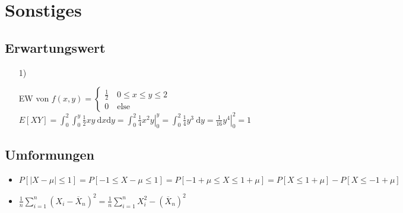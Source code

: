 
\section{Sonstiges}
\subsection{Erwartungswert}
\begin{itemize}
    \item[1)]
        \begin{itemize}
             EW von $f(x,y) =
                \begin{cases}
                    \frac{1}{2} \quad 0 \le x \le y \le 2\\
                    0 \quad \text{else}
                \end{cases}$
                $E[XY] = \int_0^2 \int_0^y \frac{1}{2} x y \ \mathrm{d}x \mathrm{d}y = \int_0^2 \left. \frac{1}{4} x^2 y \right|_0^y = \int_0^2 \frac{1}{4} y^3 \ \mathrm{d}y = \left. \frac{1}{16} y^4 \right|_0^2 = 1$
        \end{itemize}
\end{itemize}

\subsection{Umformungen}
\begin{itemize}
    \item $P[|X - \mu| \le 1] = P[-1 \le X - \mu \le 1] = P[-1 + \mu \le X \le 1 + \mu] = P[X \le 1 + \mu] - P[X \le -1 + \mu]$
    \item $\frac{1}{n} \sum_{i=1}^{n} (X_i - \overline X_n)^2 = \frac{1}{n} \sum_{i=1}^n X_i^2 - (\overline X_n)^2$
\end{itemize}

